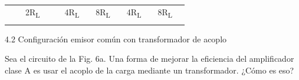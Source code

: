 \documentclass[12pt]{article}
\begin{document}
\begin{table}[H]
\begin{tabular}{p{0.38in}p{-0.12in}p{0.06in}p{0.09in}p{-0.18in}p{0.06in}p{-0.01in}p{0.06in}p{0.12in}p{0.06in}p{-0.01in}p{0.06in}p{0.69in}}
\hhline{~~~~~~~~~~~~~}
\multicolumn{1}{p{0.38in}}{} & 
\multicolumn{1}{p{-0.12in}}{} & 
\multicolumn{1}{p{0.06in}}{2R\textsubscript{L}} & 
\multicolumn{1}{p{0.09in}}{} & 
\multicolumn{1}{p{-0.18in}}{} & 
\multicolumn{1}{p{0.06in}}{4R\textsubscript{L}} & 
\multicolumn{1}{p{-0.01in}}{} & 
\multicolumn{1}{p{0.06in}}{8R\textsubscript{L}} & 
\multicolumn{1}{p{0.12in}}{} & 
\multicolumn{1}{p{0.06in}}{4R\textsubscript{L}} & 
\multicolumn{1}{p{-0.01in}}{} & 
\multicolumn{1}{p{0.06in}}{8R\textsubscript{L}} & 
\multicolumn{1}{p{0.69in}}{} \\
\hhline{~~~~~~~~~~~~~}

\end{tabular}
 \end{table}




\vspace{\baselineskip}
\begin{adjustwidth}{0.86in}{0.0in}
\textcolor[HTML]{5C2D91}{4.2 \tabto{1.26in} Configuración emisor común con transformador de acoplo}\par

\end{adjustwidth}


\vspace{\baselineskip}
\begin{adjustwidth}{0.86in}{0.88in}
\begin{justify}
{\fontsize{9pt}{10.8pt}\selectfont Sea el circuito de la Fig. 6a. Una forma de mejorar la eficiencia del amplificador clase A es usar el acoplo de la carga mediante un transformador. ¿Cómo es eso?\par}
\end{justify}\par

\end{adjustwidth}


\vspace{\baselineskip}


\end{document}
